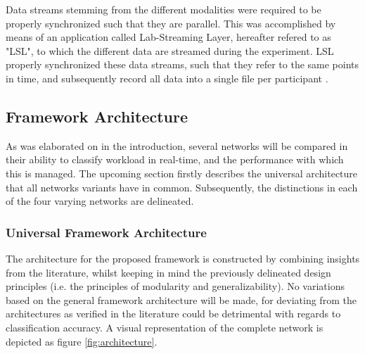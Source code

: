 \documentclass[12pt]{article}
\begin{document}
Data streams stemming from the different modalities were required to be properly synchronized such that they are parallel. This was accomplished by means of an application called Lab-Streaming Layer, hereafter refered to as "LSL", to which the different data are streamed during the experiment. LSL properly synchronized these data streams, such that they refer to the same points in time, and subsequently record all data into a single file per participant \cite{kothe2018lab}.

\subsection{Framework Architecture}
As was elaborated on in the introduction, several networks will be compared in their ability to classify workload in real-time, and the performance with which this is managed. The upcoming section firstly describes the universal architecture that all networks variants have in common. Subsequently, the distinctions in each of the four varying networks are delineated. 

\subsubsection{Universal Framework Architecture}
The architecture for the proposed framework is constructed by combining insights from the literature, whilst keeping in mind the previously delineated design principles (i.e. the principles of modularity and generalizability). No variations based on the general framework architecture will be made, for deviating from the architectures as verified in the literature could be detrimental with regards to classification accuracy. A visual representation of the complete network is depicted as figure \ref{fig:architecture}.
\end{document}
